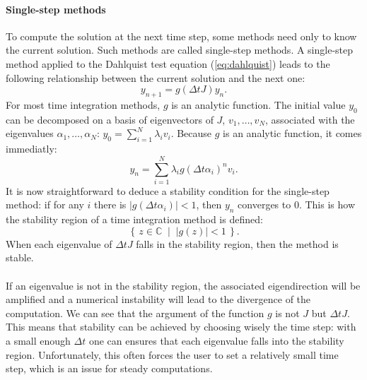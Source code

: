         \paragraph{Single-step methods}
        To compute the solution at the next time step, some methods need only to know the current solution.
        Such methods are called single-step methods.
        A single-step method applied to the Dahlquist test equation (\ref{eq:dahlquist}) leads to the following relationship between the current solution and the next one:
        \begin{equation}\label{eq:single_step}
          y_{n+1} = g\left(\Delta tJ\right)y_n .
        \end{equation}
        For most time integration methods, $g$ is an analytic function.
        The initial value $y_0$ can be decomposed on a basis of eigenvectors of $J$, $v_1, \dots, v_N$, associated with the eigenvalues $\alpha_1, \dots, \alpha_N$: $y_0 = \sum_{i=1}^N \lambda_i v_i$.
        Because $g$ is an analytic function, it comes immediatly:
        \begin{equation}
          y_n = \sum_{i=1}^N \lambda_i g\left(\Delta t \alpha_i\right)^n v_i .
        \end{equation}
        It is now straightforward to deduce a stability condition for the single-step method: if for any $i$ there is $\left|g\left(\Delta t\alpha_i\right)\right| < 1$, then $y_n$ converges to 0.
        This is how the stability region of a time integration method is defined:
        \begin{equation}
          \left\{ \, z \in \mathbb{C} \; \mid \; \left| g\left(z\right) \right| < 1 \, \right\} .
        \end{equation}
        When each eigenvalue of $\Delta t J$ falls in the stability region, then the method is stable.

        \paragraph{}
        If an eigenvalue is not in the stability region, the associated eigendirection will be amplified and a numerical instability will lead to the divergence of the computation.
        We can see that the argument of the function $g$ is not $J$ but $\Delta t J$.
        This means that stability can be achieved by choosing wisely the time step: with a small enough $\Delta t$ one can ensures that each eigenvalue falls into the stability region.
        Unfortunately, this often forces the user to set a relatively small time step, which is an issue for steady computations.


